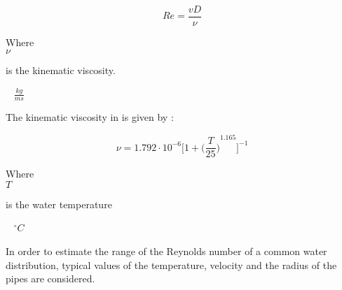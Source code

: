 \begin{equation}
   Re = \frac{vD}{\nu}
   \label{Reynolds}
 \end{equation}
 
  \begin{minipage}[t]{0.20\textwidth}
Where\\
\hspace*{8mm} $\nu$ 
\end{minipage}
\begin{minipage}[t]{0.68\textwidth}
\vspace*{2mm}
is the kinematic viscosity.

\end{minipage}
\begin{minipage}[t]{0.10\textwidth}
\vspace*{2mm}
\textcolor{White}{te}$\unit{\frac{kg}{ms}}$
\end{minipage}

The kinematic viscosity in \cite{Design_Water} is given by :

\begin{equation}
  \nu = 1.792 \cdot 10^{-6} \bigg[1+{\bigg(\frac{T}{25}\bigg)}^{1.165} \bigg]^{-1}
\end{equation}

  \begin{minipage}[t]{0.20\textwidth}
Where\\
\hspace*{8mm} $T$ 
\end{minipage}
\begin{minipage}[t]{0.68\textwidth}
\vspace*{2mm}
is the water temperature  
 \end{minipage}
\begin{minipage}[t]{0.10\textwidth}
\vspace*{2mm}
\textcolor{White}{te}$\unit{^{\circ} C}$
\end{minipage}

In order to estimate the range of the Reynolds number of a common water 
distribution, typical values of the temperature, velocity and the radius of 
the pipes are considered\cite{Urban_Design}. 


